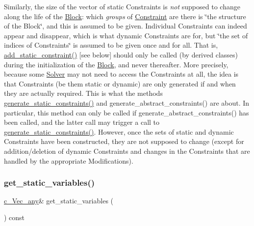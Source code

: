 Similarly, the size of the vector of static Constraints is {\itshape not} supposed to change along the life of the \mbox{\hyperlink{class_s_m_spp__di__unipi__it_1_1_block}{Block}}\+: which {\itshape groups} of \mbox{\hyperlink{class_s_m_spp__di__unipi__it_1_1_constraint}{Constraint}} are there is \char`\"{}the structure of the Block\char`\"{}, and this is assumed to be given. Individual Constraints can indeed appear and disappear, which is what dynamic Constraints are for, but \char`\"{}the set of indices of Constraints\char`\"{} is assumed to be given once and for all. That is, \mbox{\hyperlink{class_s_m_spp__di__unipi__it_1_1_block_a05ed7d7c9380f9476d53192bd2e4361d}{add\+\_\+static\+\_\+constraint()}} \mbox{[}see below\mbox{]} should only be called (by derived classes) during the initialization of the \mbox{\hyperlink{class_s_m_spp__di__unipi__it_1_1_block}{Block}}, and never thereafter. More precisely, because some \mbox{\hyperlink{class_s_m_spp__di__unipi__it_1_1_solver}{Solver}} may not need to access the Constraints at all, the idea is that Constraints (be them static or dynamic) are only generated if and when they are actually required. This is what the methods \mbox{\hyperlink{class_s_m_spp__di__unipi__it_1_1_block_add9b4c918157bda66b5183f67953d49b}{generate\+\_\+static\+\_\+constraints()}} and generate\+\_\+abstract\+\_\+constraints() are about. In particular, this method can only be called if generate\+\_\+abstract\+\_\+constraints() has been called, and the latter call may trigger a call to \mbox{\hyperlink{class_s_m_spp__di__unipi__it_1_1_block_add9b4c918157bda66b5183f67953d49b}{generate\+\_\+static\+\_\+constraints()}}. However, once the sets of static and dynamic Constraints have been constructed, they are not supposed to change (except for addition/deletion of dynamic Constraints and changes in the Constraints that are handled by the appropriate Modifications). \mbox{\label{class_s_m_spp__di__unipi__it_1_1_block_a6ca8b345bb506a8ac45eef39887bebea}} 
\subsubsection{\texorpdfstring{get\+\_\+static\+\_\+variables()}{get\_static\_variables()}}
{\footnotesize\ttfamily \mbox{\hyperlink{group___s_m_s__types_gaa16aeddc7a50d64299ee0f8d9ca5dc7d}{c\+\_\+\+Vec\+\_\+any}}\& get\+\_\+static\+\_\+variables (\begin{DoxyParamCaption}\item[{void}]{ }\end{DoxyParamCaption}) const\hspace{0.3cm}{\ttfamily [inline]}}



